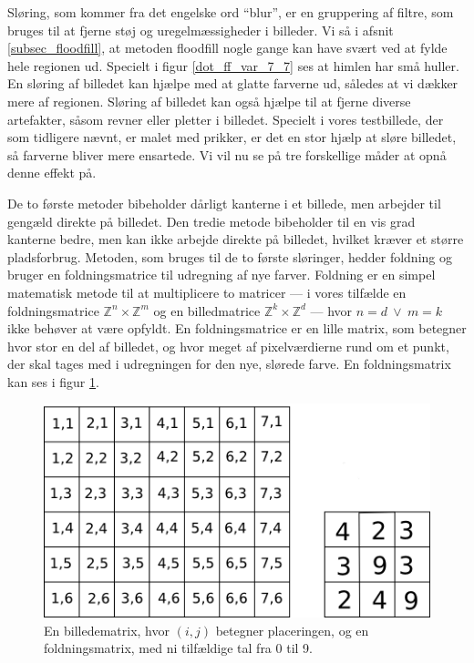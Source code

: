 {
Sløring, som kommer fra det engelske ord ``blur'', er en gruppering af
filtre, som bruges til at fjerne støj og uregelmæssigheder i billeder.
Vi så i afsnit \ref{subsec_floodfill}, at metoden floodfill nogle gange
kan have svært ved at fylde hele regionen ud. Specielt i figur
\ref{dot_ff_var_7_7} ses at himlen har små huller. En sløring af
billedet kan hjælpe med at glatte farverne ud, således at vi dækker mere
af regionen. Sløring af billedet kan også hjælpe til at fjerne diverse
artefakter, såsom revner eller pletter i billedet. Specielt i vores
testbillede, der som tidligere nævnt, er malet med prikker, er det en
stor hjælp at sløre billedet, så farverne bliver mere ensartede. Vi vil
nu se på tre forskellige måder at opnå denne effekt på.

De to første metoder bibeholder dårligt kanterne i et billede, men
arbejder til gengæld direkte på billedet. Den tredie metode bibeholder
til en vis grad kanterne bedre, men kan ikke arbejde direkte på
billedet, hvilket kræver et større pladsforbrug. Metoden, som bruges til
de to første sløringer, hedder foldning og bruger en foldningsmatrice
til udregning af nye farver. Foldning er en simpel matematisk metode til
at multiplicere to matricer --- i vores tilfælde en foldningsmatrice
$\mathbb{Z}^{n}\times{} \mathbb{Z}^{m}$ og en billedmatrice
$\mathbb{Z}^{k}\times{} \mathbb{Z}^{d}$ --- hvor $n = d ~\vee~ m = k$
ikke behøver at være opfyldt.  En foldningsmatrice er en lille matrix,
som betegner hvor stor en del af billedet, og hvor meget af
pixelværdierne rund om et punkt, der skal tages med i udregningen for
den nye, slørede farve. En foldningsmatrix kan ses i figur
\ref{Foldning}.

\begin{figure}[]
	\begin{center}
		\includegraphics[scale=0.9,angle=0]{afsnit/vores_implementation/billeder/sloering/convolution.png}
	\end{center}
    \caption[]{En billedematrix, hvor $(i,j)$ betegner placeringen, og en
    foldningsmatrix, med ni tilfældige tal fra 0 til 9.}
	\label{Foldning}
\end{figure}

}
